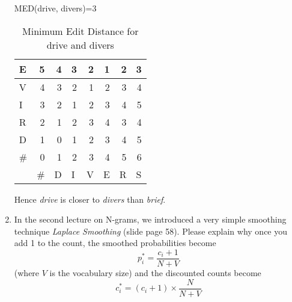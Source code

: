\documentclass[11pt]{article}
\begin{document}
\begin{enumerate}
MED(drive, divers)=3 \\
\begin{table}[htbp]
  \centering
    \begin{tabular}{|r|l|l|l|l|l|l|l|}
    \toprule
    \multicolumn{1}{|l|}{E} & \multicolumn{1}{r|}{5} & \multicolumn{1}{r|}{4} & \multicolumn{1}{r|}{3} & \multicolumn{1}{r|}{2} & \multicolumn{1}{r|}{1} & \multicolumn{1}{r|}{2} & \multicolumn{1}{r|}{3} \\
    \midrule
    \multicolumn{1}{|l|}{V} & \multicolumn{1}{r|}{4} & \multicolumn{1}{r|}{3} & \multicolumn{1}{r|}{2} & \multicolumn{1}{r|}{1} & \multicolumn{1}{r|}{2} & \multicolumn{1}{r|}{3} & \multicolumn{1}{r|}{4} \\
    \midrule
    \multicolumn{1}{|l|}{I} & \multicolumn{1}{r|}{3} & \multicolumn{1}{r|}{2} & \multicolumn{1}{r|}{1} & \multicolumn{1}{r|}{2} & \multicolumn{1}{r|}{3} & \multicolumn{1}{r|}{4} & \multicolumn{1}{r|}{5} \\
    \midrule
    \multicolumn{1}{|l|}{R} & \multicolumn{1}{r|}{2} & \multicolumn{1}{r|}{1} & \multicolumn{1}{r|}{2} & \multicolumn{1}{r|}{3} & \multicolumn{1}{r|}{4} & \multicolumn{1}{r|}{3} & \multicolumn{1}{r|}{4} \\
    \midrule
    \multicolumn{1}{|l|}{D} & \multicolumn{1}{r|}{1} & \multicolumn{1}{r|}{0} & \multicolumn{1}{r|}{1} & \multicolumn{1}{r|}{2} & \multicolumn{1}{r|}{3} & \multicolumn{1}{r|}{4} & \multicolumn{1}{r|}{5} \\
    \midrule
    \multicolumn{1}{|l|}{\#} & \multicolumn{1}{r|}{0} & \multicolumn{1}{r|}{1} & \multicolumn{1}{r|}{2} & \multicolumn{1}{r|}{3} & \multicolumn{1}{r|}{4} & \multicolumn{1}{r|}{5} & \multicolumn{1}{r|}{6} \\
    \midrule
          & \#    & D     & I     & V     & E     & R     & S \\
    \bottomrule
    \end{tabular}%
  \caption{Minimum Edit Distance for drive and divers}
  \end{table}%

Hence \textit{drive} is closer to \textit{divers} than \textit{brief}.

\vspace{10pt}

\item In the second lecture on N-grams, we introduced a very simple smoothing technique {\em Laplace Smoothing} (slide page 58). Please explain why once you add 1 to the count, the smoothed probabilities become \[p_{i}^*=\frac{c_{i}+1} {N+V}\] (where $V$ is the vocabulary size) and the discounted counts become \[c_{i}^{*} = (c_{i}+1) \times \frac{N}{N+V}\] 
 

\end{enumerate}
\end{document}
